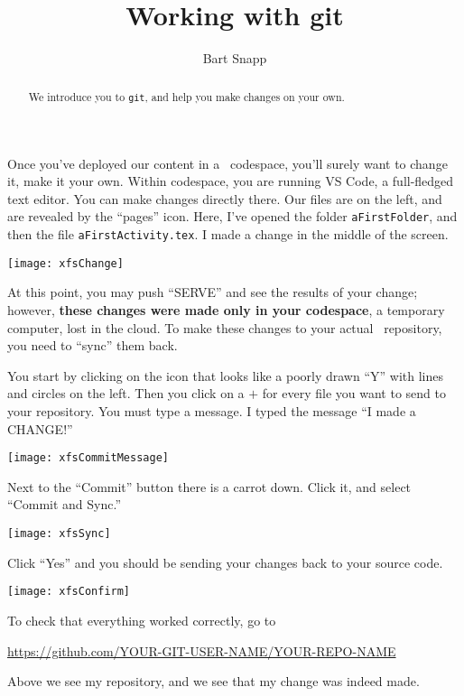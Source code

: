 \documentclass{ximera}
\author{Bart Snapp}
\title{Working with git}
\begin{document}
\pdfOnly{\onecolumn}
\begin{abstract}
    We introduce you to \texttt{git}, and help you make changes on your own.
\end{abstract}
\maketitle

Once you've deployed our content in a \github\ codespace, you'll surely want to
change it, make it your own. Within codespace, you are running VS Code, a
full-fledged text editor. You can make changes directly there. Our files are on
the left, and are revealed by the ``pages'' icon.
Here, I've opened the folder \verb!aFirstFolder!, and then the file
\verb!aFirstActivity.tex!. I made a change in the middle of the screen.
\begin{image}
    \texttt{[image: xfsChange]}
\end{image}
At this point, you may push ``SERVE'' and see the results of your change;
however, \textbf{these changes were made only in your codespace}, a temporary
computer, lost in the cloud. To make these changes to your actual \github\
repository, you need to ``sync'' them back.

\newpage

You start by clicking on the icon that looks like a poorly drawn ``Y'' with
lines and circles on the left. Then you click on a $+$ for every file you want
to send to your repository. You must type a message. I typed the message ``I
made a CHANGE!''
\begin{image}
    \texttt{[image: xfsCommitMessage]}
\end{image}

\newpage

Next to the ``Commit'' button there is a carrot down. Click it, and select
``Commit and Sync.''
\begin{image}
    \texttt{[image: xfsSync]}
\end{image}
Click ``Yes'' and you should be sending your changes back to your source code.

\newpage

\begin{image}
    \texttt{[image: xfsConfirm]}
\end{image}
To check that everything worked correctly, go to
\begin{center}
    \url{https://github.com/YOUR-GIT-USER-NAME/YOUR-REPO-NAME}
\end{center}
Above we see my repository, and we see that my change was indeed made.
\end{document}
